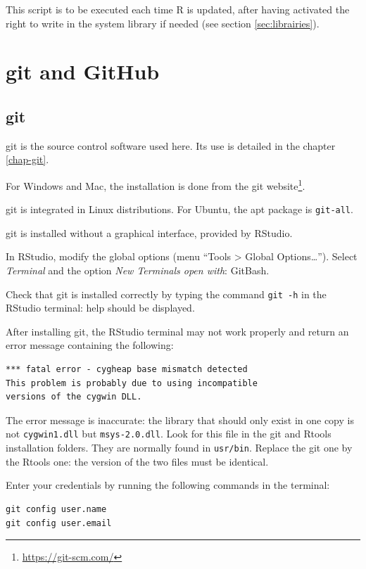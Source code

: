 \documentclass[
  12pt,
  american,
  a4paper,
  extrafontsizes,onecolumn,openright
  ]{memoir}
\newlength{\rf}
\begin{document}
This script is to be executed each time R is updated, after having activated the right to write in the system library if needed (see section \ref{sec:librairies}).

\section{git and GitHub}\label{git-and-github}

\subsection{git}\label{git}

git is the source control software used here.
Its use is detailed in the chapter \ref{chap-git}.

For Windows and Mac, the installation is done from the git website\footnote{\url{https://git-scm.com/}}.

git is integrated in Linux distributions.
For Ubuntu, the apt package is \texttt{git-all}.

git is installed without a graphical interface, provided by RStudio.

In RStudio, modify the global options (menu \enquote{Tools \textgreater{} Global Options\ldots{}}).
Select \emph{Terminal} and the option \emph{New Terminals open with}: GitBash.

Check that git is installed correctly by typing the command \texttt{git\ -h} in the RStudio terminal: help should be displayed.

After installing git, the RStudio terminal may not work properly and return an error message containing the following:

\begin{verbatim}
*** fatal error - cygheap base mismatch detected
This problem is probably due to using incompatible 
versions of the cygwin DLL.
\end{verbatim}

The error message is inaccurate: the library that should only exist in one copy is not \texttt{cygwin1.dll} but \texttt{msys-2.0.dll}.
Look for this file in the git and Rtools installation folders.
They are normally found in \texttt{usr/bin}.
Replace the git one by the Rtools one: the version of the two files must be identical.

Enter your credentials by running the following commands in the terminal:

\begin{verbatim}
git config user.name
git config user.email
\end{verbatim}
\end{document}
